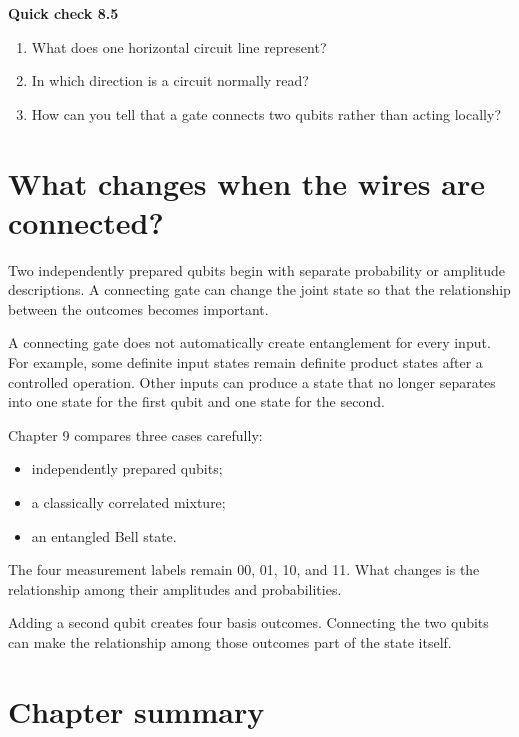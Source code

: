 \begin{checkpoint}
\textbf{Quick check 8.5}
\begin{enumerate}
  \item What does one horizontal circuit line represent?
  \item In which direction is a circuit normally read?
  \item How can you tell that a gate connects two qubits rather than acting locally?
\end{enumerate}
\end{checkpoint}

\section{What changes when the wires are connected?}
\label{sec:ch08-connected-preview}

Two independently prepared qubits begin with separate probability or amplitude descriptions. A connecting gate can change the joint state so that the relationship between the outcomes becomes important.

A connecting gate does not automatically create entanglement for every input. For example, some definite input states remain definite product states after a controlled operation. Other inputs can produce a state that no longer separates into one state for the first qubit and one state for the second.

Chapter 9 compares three cases carefully:
\begin{itemize}
  \item independently prepared qubits;
  \item a classically correlated mixture;
  \item an entangled Bell state.
\end{itemize}
The four measurement labels remain 00, 01, 10, and 11. What changes is the relationship among their amplitudes and probabilities.

\begin{coreidea}
Adding a second qubit creates four basis outcomes. Connecting the two qubits can make the relationship among those outcomes part of the state itself.
\end{coreidea}

\section{Chapter summary}
\label{sec:ch08-summary}

